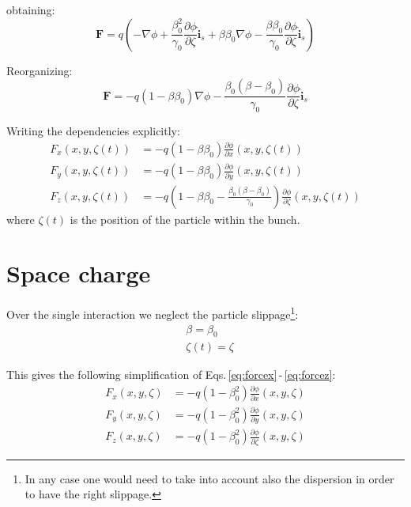 obtaining:
\begin{equation}
\textbf{F} 
=q \left( -\nabla \phi +\frac{\beta_0^2}{\gamma_0}\frac{\partial \phi}{\partial \zeta}\hat{\textbf{i}}_s
 + \beta  \beta_0\nabla \phi - \frac{\beta \beta_0}{\gamma_0} \frac{\partial \phi}{\partial \zeta} \hat{\textbf{i}}_s
  \right)
\end{equation}


Reorganizing:
\begin{equation}
\textbf{F} 
=  -q(1-\beta  \beta_0)\nabla \phi -\frac{\beta_0(\beta-\beta_0)}{\gamma_0}\frac{\partial \phi}{\partial \zeta}\hat{\textbf{i}}_s
\end{equation}

Writing the dependencies explicitly:
\begin{align}
F_x(x, y, \zeta(t)) &=  -q(1-\beta  \beta_0) \frac{\partial \phi}{\partial x}(x, y, \zeta(t))\label{eq:forcex}\\
F_y(x, y, \zeta(t)) &=  -q(1-\beta  \beta_0) \frac{\partial \phi}{\partial y}(x, y, \zeta(t))\label{eq:forcey}\\
F_z(x, y, \zeta(t)) &=  -q\left(1-\beta  \beta_0 -\frac{\beta_0(\beta-\beta_0)}{\gamma_0}\right) \frac{\partial \phi}{\partial \zeta}(x, y, \zeta(t))\label{eq:forcez}
\end{align}
where $\zeta(t)$ is the position of the particle within the bunch.


\section{Space charge}

Over the single interaction we neglect the particle slippage\footnote{In any case one would need to take into account also the dispersion in order to have the right slippage.}:
\begin{align}
&\beta = \beta_0\\
&\zeta(t) = \zeta
\end{align}

This gives the following simplification of Eqs.\,\eqref{eq:forcex}\,-\,\eqref{eq:forcez}:
\begin{align}
F_x(x, y, \zeta) &=  -q(1-\beta_0^2) \frac{\partial \phi}{\partial x}(x, y, \zeta)\\
F_y(x, y, \zeta) &=  -q(1-\beta_0^2) \frac{\partial \phi}{\partial y}(x, y, \zeta)\\
F_z(x, y, \zeta) &=  -q (1-\beta_0^2) \frac{\partial \phi}{\partial \zeta}(x, y, \zeta)
\end{align}


